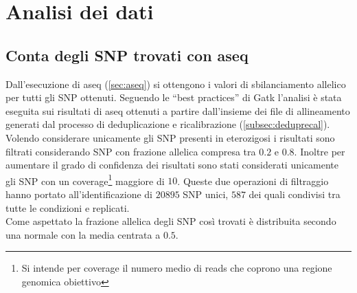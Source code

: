 \graphicspath{{chapters/04/media/}}
\chapter{Analisi dei dati}
\label{cha:analisi}
\section{Conta degli SNP trovati con aseq}
\label{sec:snpcount}
Dall'esecuzione di aseq (\ref{sec:aseq}) si ottengono i valori di sbilanciamento allelico per tutti gli SNP ottenuti.
Seguendo le ``best practices'' di Gatk \cite{gatk} l'analisi \`e stata eseguita sui risultati di aseq ottenuti a partire dall'insieme dei file di allineamento generati dal processo di deduplicazione e ricalibrazione (\ref{subsec:deduprecal}).\\
Volendo considerare unicamente gli SNP presenti in eterozigosi i risultati sono filtrati considerando SNP con frazione allelica compresa tra $0.2$ e $0.8$.
Inoltre per aumentare il grado di confidenza dei risultati sono stati considerati unicamente gli SNP con un coverage\footnote{Si intende per coverage il numero medio di reads che coprono una regione genomica obiettivo} maggiore di $10$.
Queste due operazioni di filtraggio hanno portato all'identificazione di $20895$ SNP unici, $587$ dei quali condivisi tra tutte le condizioni e replicati.\\
Come aspettato la frazione allelica degli SNP cos\`i trovati \`e distribuita secondo una normale con la media centrata a $0.5$.\\
